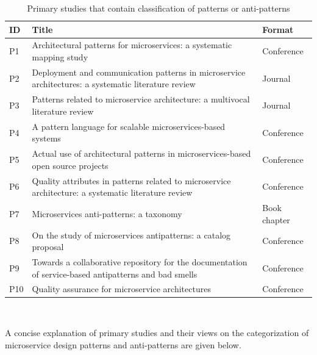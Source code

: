 \documentclass{Configuration_Files/PoliMi3i_thesis}
\begin{document}
\begin{table}[H]
\centering 
    \begin{tabular}{|l p{28em} l|}
    \hline
    \rowcolor{bluepoli!40}
    \textbf{ID} & \textbf{Title} & \textbf{Format}\T\B \\
    \hline \hline
    P1 & Architectural patterns for microservices: a systematic mapping study \cite{TaibiD2018APfM} & Conference\T\B\\
    \hline
    \rowcolor{bluepoli!10}
    P2 & Deployment and communication patterns in microservice architectures: a systematic literature review \cite{KARABEYAKSAKALLI2021111014} & Journal\T\B\\
    \hline
    P3 & Patterns related to microservice architecture: a multivocal literature review \cite{valdivia} & Journal\T\B\\
    \hline
    \rowcolor{bluepoli!10}
    P4 & A pattern language for scalable microservices-based systems \cite{10.1145/3241403.3241429} & Conference \T\B\\
    \hline
    P5 & Actual use of architectural patterns in microservices-based open source projects \cite{8719492} & Conference\T\B\\
    \hline
    \rowcolor{bluepoli!10}
    P6 & Quality attributes in patterns related to microservice architecture: a systematic literature review \cite{9105640} & Conference\T\B\\
    \hline
    P7 & Microservices anti-patterns: a taxonomy \cite{Taibi2020} & Book chapter\T\B\\
    \hline
    \rowcolor{bluepoli!10}
    P8 & On the study of microservices antipatterns: a catalog proposal \cite{10.1145/3424771.3424812} & Conference\T\B\\
    \hline
    P9 & Towards a collaborative repository for the documentation of service-based antipatterns and bad smells \cite{8712355} & Conference\T\B\\
    \hline
    \rowcolor{bluepoli!10}
    P10 & Quality assurance for microservice architectures \cite{9522227} & Conference\T\B\\
    \hline
    \end{tabular}
    \\[10pt]
    \caption{Primary studies that contain classification of patterns or anti-patterns}
    \label{table:primary_studies}
\end{table}

A concise explanation of primary studies and their views on the categorization of microservice design patterns and anti-patterns are given below.
\end{document}
